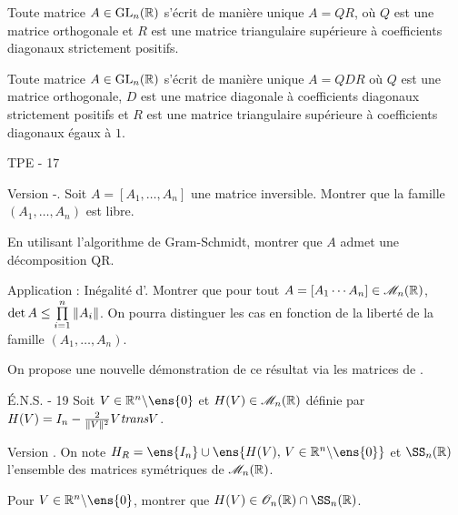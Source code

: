 \begin{theo}[Décomposition QR]
Toute matrice $A \in \mathrm{GL}_n(\mathbb{R})$ s'écrit de manière unique $A = Q R$, où $Q$ est une matrice orthogonale et $R$ est une matrice triangulaire supérieure à coefficients diagonaux strictement positifs.
\end{theo}


\begin{proposition}
Toute matrice $A \in \mathrm{GL}_n(\mathbb{R})$ s'écrit de manière unique $A = Q D R$ où $Q$ est une matrice orthogonale, $D$ est une matrice diagonale à coefficients diagonaux strictement positifs et $R$ est une matrice triangulaire supérieure à coefficients diagonaux égaux à $1$.
\end{proposition}

{TPE - 17}%



{Version \cite{Gram}-\cite{Schmidt}.} Soit $A = [A_1,\ldots,A_n]$ une matrice inversible.
Montrer que la famille $(A_1,\ldots,A_n)$ est libre.

En utilisant l'algorithme de Gram-Schmidt, montrer que $A$ admet une décomposition QR.

{Application : Inégalité d'\cite{Hadamard}.} Montrer que pour tout $A = [A_1 \cdots A_n] \in \mathscr{M}_n(\mathbb{R})$, $\det A \leq \prod\limits_{i=1}^n \Vert A_{i} \Vert$. On pourra distinguer les cas en fonction de la liberté de la famille $(A_1,\ldots,A_n)$.


\medskip

On propose une nouvelle démonstration de ce résultat via les matrices de \cite{Householder}.

É.N.S. - 19
Soit $V \in \R^n \backslash \ens{0}$ et $H(V) \in \mathscr{M}_n(\mathbb{R})$ définie par $H(V) = I_n - \frac{2}{\Vert V \Vert^2} V \textit{trans}{V}$.

{Version \cite{Householder}.}
On note $H_R = \ens{I_n} \cup \ens{H(V),\, V \in \R^n \backslash\ens{0}}$ et $\SS_n(\R)$ l'ensemble des matrices symétriques de $\mathscr{M}_n(\mathbb{R})$.

Pour $V \in \R^n \backslash \ens{0}$, montrer que $H(V) \in \mathscr{O}_n(\R) \cap \SS_n(\R)$.

